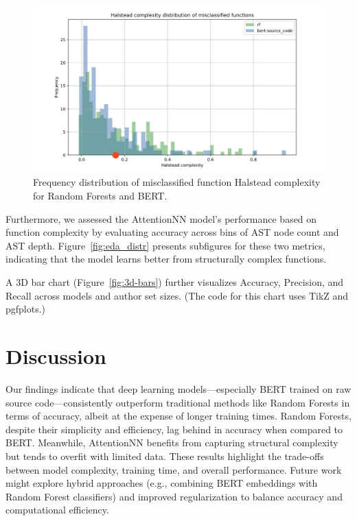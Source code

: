 \documentclass[conference]{IEEEtran}
\begin{document}
\begin{figure}[!b]
    \centering
    \hspace*{-25pt}\includegraphics[width=1.2\columnwidth]{figures/misclass_hs.png}
    \caption{Frequency distribution of misclassified function Halstead complexity for Random Forests and BERT.}
    \label{fig:misclass_halstead}
\end{figure}

Furthermore, we assessed the AttentionNN model’s performance based on function complexity by evaluating accuracy across bins of AST node count and AST depth. Figure~\ref{fig:eda_distr} presents subfigures for these two metrics, indicating that the model learns better from structurally complex functions.

A 3D bar chart (Figure~\ref{fig:3d-bars}) further visualizes Accuracy, Precision, and Recall across models and author set sizes. (The code for this chart uses TikZ and pgfplots.)

\section{Discussion}

Our findings indicate that deep learning models—especially BERT trained on raw source code—consistently outperform traditional methods like Random Forests in terms of accuracy, albeit at the expense of longer training times. Random Forests, despite their simplicity and efficiency, lag behind in accuracy when compared to BERT. Meanwhile, AttentionNN benefits from capturing structural complexity but tends to overfit with limited data. These results highlight the trade-offs between model complexity, training time, and overall performance. Future work might explore hybrid approaches (e.g., combining BERT embeddings with Random Forest classifiers) and improved regularization to balance accuracy and computational efficiency.
\end{document}
